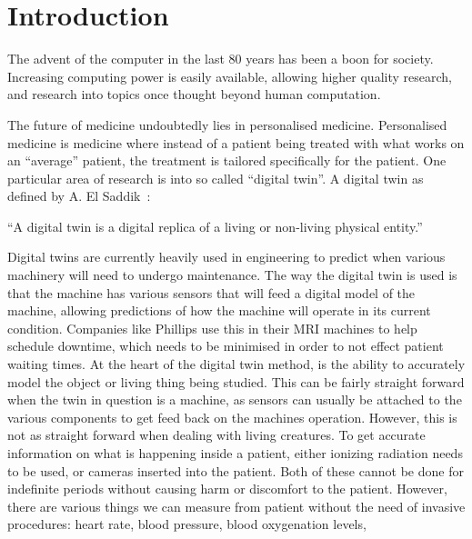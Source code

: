 \chapter{Introduction}






The advent of the computer in the last 80 years has been a boon for society.
Increasing computing power is easily available, allowing higher quality research, and research into topics once thought beyond human computation.

The future of medicine undoubtedly lies in personalised medicine.
Personalised medicine is medicine where instead of a patient being treated with what works on an ``average'' patient, the treatment is tailored specifically for the patient.
One particular area of research is into so called ``digital twin''.
A digital twin as defined by A. El Saddik~\cite{el2018digital}:

\medskip
``A digital twin is a digital replica of a living or non-living physical entity.''
\medskip

Digital twins are currently heavily used in engineering to predict when various machinery will need to undergo maintenance.
The way the digital twin is used is that the machine has various sensors that will feed a digital model of the machine, allowing predictions of how the machine will operate in its current condition.
Companies like Phillips use this in their MRI machines to help schedule downtime, which needs to be minimised in order to not effect patient waiting times.
At the heart of the digital twin method, is the ability to accurately model the object or living thing being studied.
This can be fairly straight forward when the twin in question is a machine, as sensors can usually be attached to the various components to get feed back on the machines operation.
However, this is not as straight forward when dealing with living creatures.
To get accurate information on what is happening inside a patient, either ionizing radiation needs to be used, or cameras inserted into the patient.
Both of these cannot be done for indefinite periods without causing harm or discomfort to the patient.
However, there are various things we can measure from patient without the need of invasive procedures: heart rate, blood pressure, blood oxygenation levels, 


